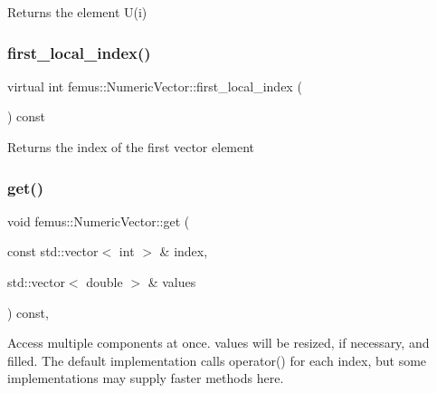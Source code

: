 \begin{DoxyReturn}{Returns}
the element {\ttfamily U(i)} 
\end{DoxyReturn}
\mbox{\label{classfemus_1_1_numeric_vector_a0249a27bfb19a2b8c7eb87b30b3e8ec0}} 
\subsubsection{\texorpdfstring{first\+\_\+local\+\_\+index()}{first\_local\_index()}}
{\footnotesize\ttfamily virtual int femus\+::\+Numeric\+Vector\+::first\+\_\+local\+\_\+index (\begin{DoxyParamCaption}{ }\end{DoxyParamCaption}) const\hspace{0.3cm}{\ttfamily [pure virtual]}}

\begin{DoxyReturn}{Returns}
the index of the first vector element 
\end{DoxyReturn}
\mbox{\label{classfemus_1_1_numeric_vector_a3b3e0e4ad00dfd23aee8d226264cfbb9}} 
\subsubsection{\texorpdfstring{get()}{get()}}
{\footnotesize\ttfamily void femus\+::\+Numeric\+Vector\+::get (\begin{DoxyParamCaption}\item[{const std\+::vector$<$ int $>$ \&}]{index,  }\item[{std\+::vector$<$ double $>$ \&}]{values }\end{DoxyParamCaption}) const\hspace{0.3cm}{\ttfamily [inline]}, {\ttfamily [virtual]}}

Access multiple components at once. {\ttfamily values} will be resized, if necessary, and filled. The default implementation calls {\ttfamily operator()} for each index, but some implementations may supply faster methods here. \mbox{\label{classfemus_1_1_numeric_vector_abd17257b0b8aa9e09fd13cbd9c0bed08}} 
